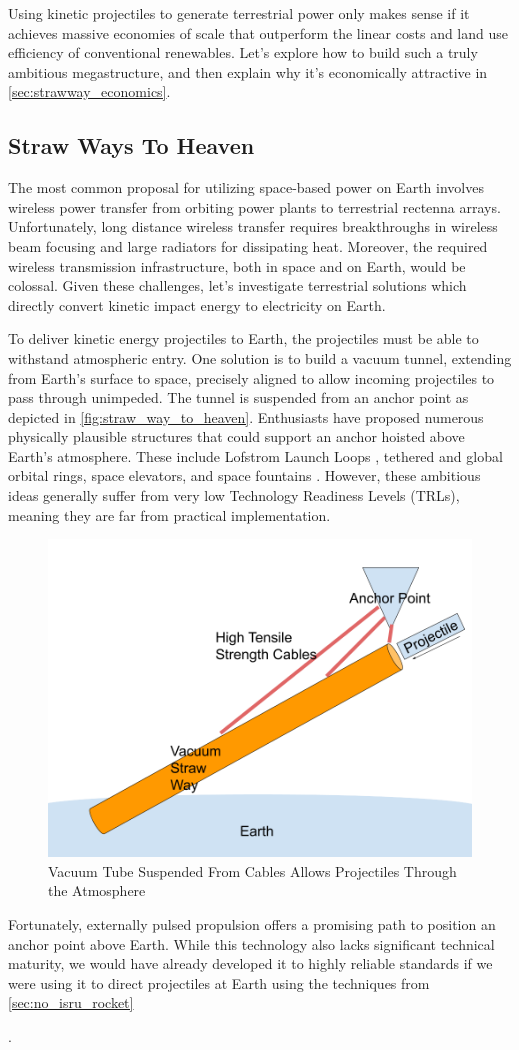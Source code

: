 \documentclass{article}
\begin{document}
{Using kinetic projectiles to generate terrestrial power only makes sense if it achieves massive economies of scale that outperform the linear costs and land use efficiency of conventional renewables.  Let's explore how to build such a truly ambitious megastructure, and then explain why it's economically attractive in \autoref{sec:strawway_economics}.     

\subsection{Straw Ways To Heaven}\label{sec:straw_way_to_heaven}
The most common proposal for utilizing space-based power on Earth involves wireless power transfer from orbiting power plants to terrestrial rectenna arrays.  Unfortunately, long distance wireless transfer requires breakthroughs in wireless beam focusing \cite{space_beaming_power} and large radiators for dissipating heat. Moreover, the required wireless transmission infrastructure, both in space and on Earth, would be colossal.  Given these challenges, let's investigate terrestrial solutions which directly convert kinetic impact energy to electricity on Earth.

To deliver kinetic energy projectiles to Earth, the projectiles must be able to withstand atmospheric entry.  One solution is to build a vacuum tunnel, extending from Earth's surface to space, precisely aligned to allow incoming projectiles to pass through unimpeded.  The tunnel is suspended from an anchor point as depicted in \autoref{fig:straw_way_to_heaven}.   Enthusiasts have proposed numerous physically plausible structures that could support an anchor hoisted above Earth's atmosphere. These include Lofstrom Launch Loops \cite {lofstrom_loop}, tethered and global orbital rings, space elevators, and space fountains \cite{isaac_arthur_megastructure_complation}.  However, these ambitious ideas generally suffer from very low Technology Readiness Levels (TRLs), meaning they are far from practical implementation.

\begin{figure}[htpb]
    \centering
    \includegraphics[width=0.5\linewidth]{images/Straw Way To Heaven.png}
    \caption{Vacuum Tube Suspended From Cables Allows Projectiles Through the Atmosphere}
    \label{fig:straw_way_to_heaven}
\end{figure}


Fortunately, externally pulsed propulsion offers a promising path to position an anchor point above Earth. While this technology also lacks significant technical maturity, we would have already developed it to highly reliable standards if we were using it to direct projectiles at Earth using the techniques from \autoref{sec:no_isru_rocket}}.  
\end{document}
